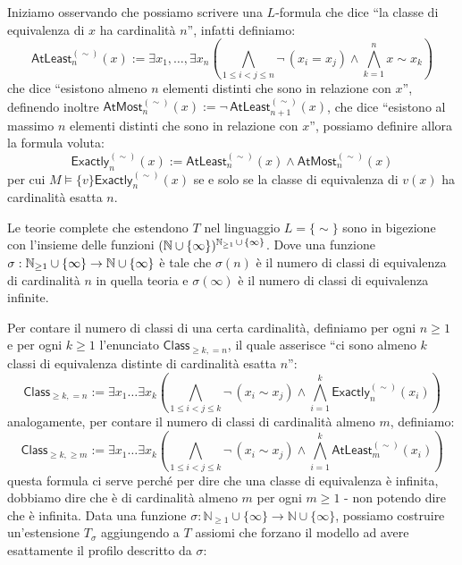 \begin{soln}
    Iniziamo osservando che possiamo scrivere una $L$-formula che dice ``la classe di equivalenza di $x$ ha cardinalità $n$'', infatti definiamo:
    \[ \mathsf{AtLeast}_n^{(\sim)}(x) := \exists x_1, \ldots, \exists x_n \left(\bigwedge_{1 \leq i < j \leq n} \neg\, (x_i = x_j) \land \bigwedge_{k = 1}^n x \sim x_k \right) \]
    che dice ``esistono almeno $n$ elementi distinti che sono in relazione con $x$'', definendo inoltre $\mathsf{AtMost}_n^{(\sim)}(x) := \neg\, \mathsf{AtLeast}_{n+1}^{(\sim)}(x)$, che dice ``esistono al massimo $n$ elementi distinti che sono in relazione con $x$'',
    possiamo definire allora la formula voluta:
    \[ \mathsf{Exactly}_n^{(\sim)}(x) := \mathsf{AtLeast}_n^{(\sim)}(x) \land \mathsf{AtMost}_n^{(\sim)}(x) \]
    per cui $M \models \{v\} \mathsf{Exactly}_n^{(\sim)}(x)$ se e solo se la classe di equivalenza di $v(x)$ ha cardinalità esatta $n$.\\
    \begin{claim}
        Le teorie complete che estendono $T$ nel linguaggio $L = \{\sim\}$ sono in bigezione con l'insieme delle funzioni $(\mathbb N \cup \{\infty\})^{\mathbb N_{\geq 1} \,\cup \,\{\infty\}}$.
        Dove una funzione $\sigma : \mathbb N_{\geq 1} \cup \{\infty\} \to \mathbb N \cup \{\infty\}$ è tale che $\sigma(n)$ è il numero di classi di equivalenza di cardinalità $n$ in quella teoria e $\sigma(\infty)$ è il numero di classi di equivalenza infinite.
    \end{claim}
    Per contare il numero di classi di una certa cardinalità, definiamo per ogni $n \geq 1$ e per ogni $k \geq 1$ l'enunciato $\mathsf{Class}_{\geq k, = n}$, il quale asserisce ``ci sono almeno $k$ classi di equivalenza distinte di cardinalità esatta $n$'':
    \[ \mathsf{Class}_{\geq k, = n} := \exists x_1 \dots \exists x_k \left( \bigwedge_{1 \leq i < j \leq k} \neg\,(x_i \sim x_j) \land \bigwedge_{i=1}^k \mathsf{Exactly}_n^{(\sim)}(x_i) \right) \]
    analogamente, per contare il numero di classi di cardinalità almeno $m$, definiamo:
    \[ \mathsf{Class}_{\geq k, \geq m} := \exists x_1 \dots \exists x_k \left( \bigwedge_{1 \leq i < j \leq k} \neg\,(x_i \sim x_j) \land \bigwedge_{i=1}^k \mathsf{AtLeast}_m^{(\sim)}(x_i) \right) \]
    questa formula ci serve perché per dire che una classe di equivalenza è infinita, dobbiamo dire che è di cardinalità almeno $m$ per ogni $m \geq 1$ - non potendo dire che è infinita.
    Data una funzione $\sigma : \mathbb{N}_{\geq 1} \cup \{\infty\} \to \mathbb{N} \cup \{\infty\}$, possiamo costruire un'estensione $T_{\sigma}$ aggiungendo a $T$ assiomi che forzano il modello ad avere esattamente il profilo descritto da $\sigma$:

\end{soln}
